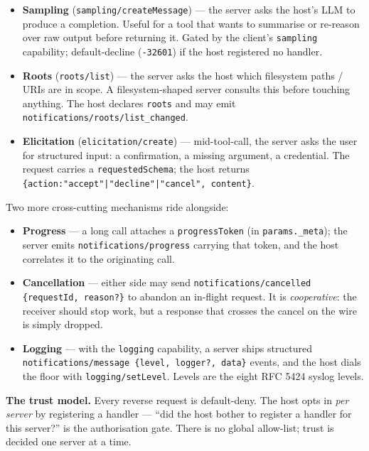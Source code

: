 \documentclass[10pt]{article}
\newcommand{\code}[1]{\texttt{\small #1}}
\begin{document}
\begin{itemize}
  \item \textbf{Sampling} (\code{sampling/createMessage}) --- the server asks the
    host's LLM to produce a completion. Useful for a tool that wants to summarise
    or re-reason over raw output before returning it. Gated by the client's
    \code{sampling} capability; default-decline (\code{-32601}) if the host
    registered no handler.
  \item \textbf{Roots} (\code{roots/list}) --- the server asks the host which
    filesystem paths / URIs are in scope. A filesystem-shaped server consults
    this before touching anything. The host declares \code{roots} and may emit
    \code{notifications/roots/list\_changed}.
  \item \textbf{Elicitation} (\code{elicitation/create}) --- mid-tool-call, the
    server asks the user for structured input: a confirmation, a missing
    argument, a credential. The request carries a \code{requestedSchema}; the
    host returns \code{\{action:"accept"|"decline"|"cancel", content\}}.
\end{itemize}

Two more cross-cutting mechanisms ride alongside:

\begin{itemize}
  \item \textbf{Progress} --- a long call attaches a \code{progressToken} (in
    \code{params.\_meta}); the server emits \code{notifications/progress} carrying
    that token, and the host correlates it to the originating call.
  \item \textbf{Cancellation} --- either side may send
    \code{notifications/cancelled \{requestId, reason?\}} to abandon an in-flight
    request. It is \emph{cooperative}: the receiver should stop work, but a
    response that crosses the cancel on the wire is simply dropped.
  \item \textbf{Logging} --- with the \code{logging} capability, a server ships
    structured \code{notifications/message \{level, logger?, data\}} events, and
    the host dials the floor with \code{logging/setLevel}. Levels are the eight
    RFC 5424 syslog levels.
\end{itemize}

\textbf{The trust model.} Every reverse request is default-deny. The host opts in
\emph{per server} by registering a handler --- ``did the host bother to register a
handler for this server?'' is the authorisation gate. There is no global
allow-list; trust is decided one server at a time.
\end{document}
